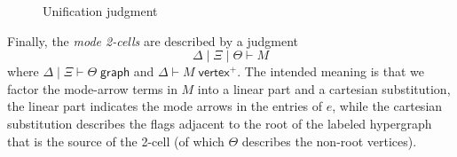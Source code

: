 \documentclass{article}
\theoremstyle{definition}
\theoremstyle{remark}
\def\ec{\diamond}
\def\loopctx{\;\mathsf{loopctx}}
\def\extvertex{\;\mathsf{vertex}^+}
\def\graph{\;\mathsf{graph}}
\let\types\vdash
\def\unifies#1#2#3#4#5{(#1\mid #2) \leadsto (#3\mid#4) : #5}
\begin{document}
\begin{figure}\centering
{}
\caption{Unification judgment}
\label{fig:unifies}
\end{figure}

Finally, the \emph{mode 2-cells} are described by a judgment
\[ \Delta \mid \Xi \mid \Theta \types M \]
where $\Delta\mid\Xi\types \Theta\graph$ and $\Delta\types M \extvertex$.
The intended meaning is that we factor the mode-arrow terms in $M$ into a linear part and a cartesian substitution, the linear part indicates the mode arrows in the entries of $e$, while the cartesian substitution describes the flags adjacent to the root of the labeled hypergraph that is the source of the 2-cell (of which $\Theta$ describes the non-root vertices).
\end{document}
